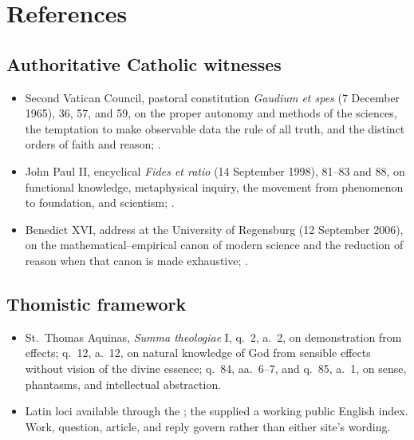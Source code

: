 \section{References}

\begingroup
\sloppy

\subsection*{Authoritative Catholic witnesses}

{\fontsize{8.6}{9.6}\selectfont
\begin{itemize}[itemsep=0pt,parsep=0pt,topsep=0.05em]
\item Second Vatican Council, pastoral constitution \emph{Gaudium et spes} (7 December 1965), 36, 57, and 59, on the proper autonomy and methods of the sciences, the temptation to make observable data the rule of all truth, and the distinct orders of faith and reason; .
\item John Paul II, encyclical \emph{Fides et ratio} (14 September 1998), 81--83 and 88, on functional knowledge, metaphysical inquiry, the movement from phenomenon to foundation, and scientism; .
\item Benedict XVI, address at the University of Regensburg (12 September 2006), on the mathematical--empirical canon of modern science and the reduction of reason when that canon is made exhaustive; .
\end{itemize}}

\subsection*{Thomistic framework}

{\fontsize{8.6}{9.6}\selectfont
\begin{itemize}[itemsep=0pt,parsep=0pt,topsep=0.05em]
\item St.~Thomas Aquinas, \emph{Summa theologiae} I, q.~2, a.~2, on demonstration from effects; q.~12, a.~12, on natural knowledge of God from sensible effects without vision of the divine essence; q.~84, aa.~6--7, and q.~85, a.~1, on sense, phantasms, and intellectual abstraction.
\item Latin loci available through the ; the  supplied a working public English index. Work, question, article, and reply govern rather than either site's wording.
\end{itemize}}

